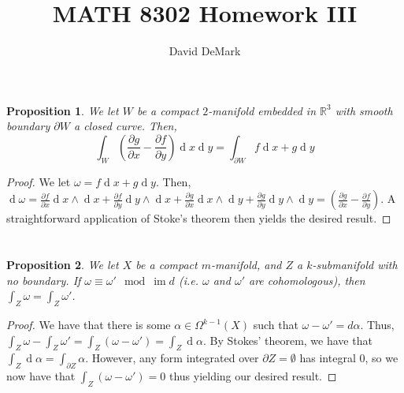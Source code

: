 \documentclass[english]{article}
\title{MATH 8302 Homework III}
\author{David DeMark}
\date{\due}
\renewcommand{\d}[1]{\ensuremath{\operatorname{d}\!{#1}}}
\newcommand{\pydx}[2]{\frac{\partial #1}{\partial #2}}
\newcommand{\RR}{\mathbb{R}}
\newcommand{\prob}[1]{\setcounter{section}{#1-1}\section{}}
\newcommand{\prt}[1]{\setcounter{subsection}{#1-1}\subsection{}}
\newtheorem*{proposition*}{Proposition}
\theoremstyle{remark}
\theoremstyle{definition}
\DeclareMathOperator{\im}{{im}}
\newcommand{\del}{\partial}
\begin{document}
\maketitle
\prob{1}
\prt{1}
\begin{proposition*}
	We let $W$ be a compact $2$-manifold embedded in $\RR^3$ with smooth boundary $\del W$ a closed curve. Then, $$\int_W \left(\pydx{g}{x}-\pydx{f}{y} \right)\d x \d y=\int_{\del W}f\d x+g\d y$$
\end{proposition*}
\begin{proof}
	We let $\omega=f \d x+g \d y$. Then, $\d \omega= \pydx{f}{x}\d x\wedge \d x+ \pydx{f}{y}\d y \wedge \d x+\pydx {g}{x}\d x \wedge \d y+\pydx{g}{y}\d y \wedge \d y=\left(\pydx{g}{x}-\pydx{f}{y}\right)$. A straightforward application of Stoke's theorem then yields the desired result.
\end{proof}
\prt{3}

\prob{3}
\begin{proposition*}
	We let $X$ be a compact $m$-manifold, and $Z$ a $k$-submanifold with no boundary. If $\omega\equiv \omega '\mod \im d$ (i.e. $\omega$ and $\omega'$ are cohomologous), then $\int_Z\omega=\int_Z\omega'$.
\end{proposition*}\begin{proof}
We have that there is some $\alpha\in \Omega^{k-1}(X)$ such that $\omega-\omega'=d\alpha$. Thus, $\int_Z\omega-\int_Z\omega'=\int_Z(\omega-\omega')=\int_Z \d\alpha$. By Stokes' theorem, we have that $\int_Z\d \alpha=\int_{\del Z}\alpha$. However, any form integrated over $\del Z=\emptyset$ has integral 0, so we now have that $\int_Z (\omega-\omega')=0$ thus yielding our desired result.
\end{proof}
\end{document}
